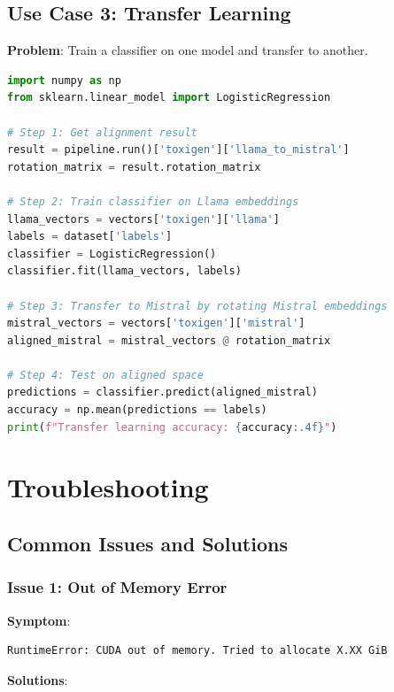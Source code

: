 \documentclass[12pt,a4paper,oneside]{report}
\begin{document}
\section{Use Case 3: Transfer Learning}

\textbf{Problem}: Train a classifier on one model and transfer to another.

\begin{lstlisting}[language=Python, caption=Transfer Learning with Aligned Spaces]
import numpy as np
from sklearn.linear_model import LogisticRegression

# Step 1: Get alignment result
result = pipeline.run()['toxigen']['llama_to_mistral']
rotation_matrix = result.rotation_matrix

# Step 2: Train classifier on Llama embeddings
llama_vectors = vectors['toxigen']['llama']
labels = dataset['labels']
classifier = LogisticRegression()
classifier.fit(llama_vectors, labels)

# Step 3: Transfer to Mistral by rotating Mistral embeddings
mistral_vectors = vectors['toxigen']['mistral']
aligned_mistral = mistral_vectors @ rotation_matrix

# Step 4: Test on aligned space
predictions = classifier.predict(aligned_mistral)
accuracy = np.mean(predictions == labels)
print(f"Transfer learning accuracy: {accuracy:.4f}")
\end{lstlisting}

\clearpage
\chapter{Troubleshooting}

\section{Common Issues and Solutions}

\subsection{Issue 1: Out of Memory Error}

\textbf{Symptom}:
\begin{lstlisting}
RuntimeError: CUDA out of memory. Tried to allocate X.XX GiB
\end{lstlisting}

\textbf{Solutions}:
\end{document}
